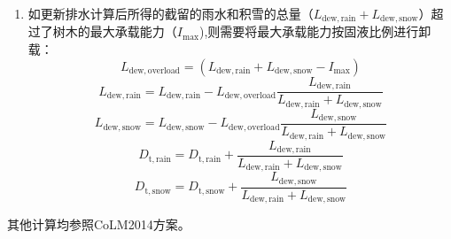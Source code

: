 \begin{enumerate}
  \item 如更新排水计算后所得的截留的雨水和积雪的总量（$L_{\mathrm{dew,rain}}+L_{\mathrm{dew,snow}}$）超过了树木的最大承载能力（$I_{\mathrm{max}}$),则需要将最大承载能力按固液比例进行卸载：
  \begin{equation}
    L_{\mathrm{dew,overload}}=(L_{\mathrm{dew,rain}}+L_{\mathrm{dew,snow}}-I_{\mathrm{max}})
  \end{equation}
  \begin{equation}
    L_{\mathrm{dew,rain}}=L_{\mathrm{dew,rain}} - L_{\mathrm{dew,overload}}  \frac{L_{\mathrm{dew,rain}}}{L_{\mathrm{dew,rain}}+L_{\mathrm{dew,snow}}}
  \end{equation}
  \begin{equation}
    L_{\mathrm{dew,snow}}=L_{\mathrm{dew,snow}} - L_{\mathrm{dew,overload}}    \frac{L_{\mathrm{dew,snow}}}{L_{\mathrm{dew,rain}}+L_{\mathrm{dew,snow}}}
  \end{equation}
  \begin{equation}
    D_{\mathrm {t,rain}}=D_{\mathrm {t,rain}} + \frac{L_{\mathrm{dew,rain}}}{L_{\mathrm{dew,rain}}+L_{\mathrm{dew,snow}}}
  \end{equation}
  \begin{equation}
    D_{\mathrm {t,snow}}=D_{\mathrm {t,snow}} + \frac{L_{\mathrm{dew,snow}}}{L_{\mathrm{dew,rain}}+L_{\mathrm{dew,snow}}}
  \end{equation}
\end{enumerate}
其他计算均参照CoLM2014方案。


